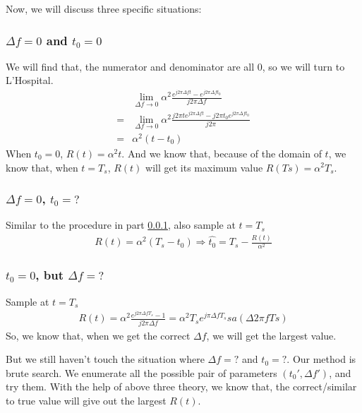 \documentclass[a4paper]{report}
\begin{document}
Now, we will discuss three specific situations:
\subsubsection{$\Delta f = 0$ and $t_0 = 0$} %
\label{ssub:no freq offset or delay}
We will find that, the numerator and denominator are all 0, so we will turn to L'Hospital.
\begin{align}
	 &\lim_{\Delta f \rightarrow 0} \alpha^2 \frac{e^{j 2\pi \Delta f t} - e^{j 2\pi \Delta f t_0}}{j 2\pi \Delta f}\\
	 =& \lim_{\Delta f \rightarrow 0} \alpha^2 \frac{j 2\pi t e^{j 2\pi \Delta f t} - j 2\pi t_0 e^{j 2\pi \Delta f t_0}}{j 2\pi}\\
	 =& \alpha^2(t - t_0)
\end{align}
When $t_0 = 0$, $R(t) = \alpha^2 t$.
And we know that, because of the domain of $t$, we know that, when $t = T_s$, $R(t)$ will get its maximum value $R(Ts) = \alpha^2 T_s$.

\subsubsection{$\Delta f = 0$, $t_0 = ?$} %
\label{ssub:no freq offset, but delay is unknown}
Similar to the procedure in part \ref{ssub:no freq offset or delay}, also sample at $t = T_s$
\begin{align}
	R(t) = \alpha^2(T_s-t_0) \Rightarrow \hat{t_0} = T_s - \frac{R(t)}{\alpha^2}
\end{align}

\subsubsection{$t_0 = 0$, but $\Delta f = ?$} %
\label{ssub:no delay, but freq offset is unknown}
Sample at $t = T_s$
\begin{align}
	R(t) = \alpha^2 \frac{e^{j 2\pi \Delta f T_s} - 1}{j 2\pi \Delta f} = \alpha^2 T_s e^{j \pi \Delta f T_s} sa(\Delta 2 \pi f Ts)
\end{align}
So, we know that, when we get the correct $\Delta f$, we will get the largest value. 

But we still haven't touch the situation where $\Delta f = ?$ and $t_0 = ?$. Our method is brute search.
We enumerate all the possible pair of parameters $(t_0', \Delta f')$, and try them. With the help of above three theory, we know that, the correct/similar to true value will give out the largest $R(t)$.
\end{document}
